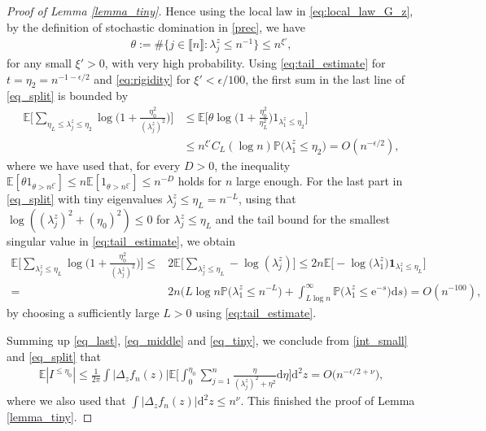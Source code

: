 \documentclass[10pt,reqno]{amsart}
\newcommand{\dd}{\mathrm{d}}
\newcommand{\<}{\langle}
\renewcommand{\>}{\rangle}
\numberwithin{equation}{section}
\begin{document}
\begin{proof}[Proof of Lemma \ref{lemma_tiny}]
	Hence using the local law in \eqref{eq:local_law_G_z}, by the definition of stochastic domination in \eqref{prec}, we have
	\begin{align}\label{eq:rigidity}
		\theta:=\#\big\{j\in \llbracket n
        \rrbracket: \lambda^z_j \leq n^{-1} \big\} \leq n^{\xi'},
	\end{align}
    for any small $\xi'>0$, with very high probability. Using \eqref{eq:tail_estimate} for $t=\eta_2=n^{-1-\epsilon/2}$ and \eqref{eq:rigidity} for $\xi'<\epsilon/100$, the first sum in the last line of \eqref{eq_split} is bounded by
	\begin{align}\label{eq_middle}
		\mathbb{E}\Big[ \sum_{\eta_L \leq  \lambda^z_j \leq \eta_2} \log \Big( 1+\frac{\eta_0^2}{(\lambda^z_j)^2}\Big)\Big] &\leq 
        \mathbb E \Big[
        \theta \log \Big( 1+\frac{\eta_0^2}{\eta_L^2}\Big)
        1_{\lambda_1^z \leq \eta_2}   
        \Big]\\
        &\leq
        n^{\xi'} C_L (\log n)\mathbb{P}\big( \lambda^z_1 \leq \eta_2 \big) =O(n^{-\epsilon/2}),
	\end{align}
where we have used
that, for every $D>0$, the inequality
$\mathbb E[\theta 1_{\theta > n^{\xi'}}]
\leq 
n\mathbb E[1_{\theta > n^{\xi'}}] 
\leq n^{-D}$ holds for $n$ large enough.
    For the last part in \eqref{eq_split} with tiny eigenvalues $\lambda^z_j \leq \eta_L=n^{-L}$, using that $\log ((\lambda^z_j)^2 + (\eta_0)^2) \leq 0$ 
    for $\lambda^z_j \leq \eta_L$ and the tail bound for the smallest singular value in \eqref{eq:tail_estimate}, we obtain
    \begin{align}\label{eq_tiny}
		\mathbb{E}\Big[ \sum_{ \lambda^z_j \leq \eta_L} \log \Big( 1+\frac{\eta_0^2}{(\lambda^z_j)^2}\Big)\Big] \leq & 2 \mathbb{E}\Big[ \sum_{ \lambda^z_j \leq \eta_L} -\log (\lambda^z_j)\Big] \leq 
        2n \mathbb{E} \Big[-\log \big(\lambda^z_1\big) \mathbf{1}_{\lambda^z_1 \leq \eta_L}  \Big]\nonumber\\
		= &  2n \bigg(
        L \log n \mathbb P \big(\lambda^z_1 
        \leq n^{-L} \big) + 
        \int_{L \log n}^{\infty} \mathbb{P}\big(\lambda^z_1 \leq \mathrm{e}^{-s} \big)\dd s \bigg) =O(n^{-100}),
	\end{align}
    by choosing a sufficiently large $L>0$ using \eqref{eq:tail_estimate}.
  
	Summing up \eqref{eq_last}, \eqref{eq_middle} and \eqref{eq_tiny}, we conclude from \eqref{int_small} and \eqref{eq_split} that
	\begin{align}
		\mathbb{E}| I^{\leq\eta_0}| \leq \frac{1}{2\pi} \int \big|\Delta_z f_n(z) \big| \mathbb{E} \Big[\int_{0}^{\eta_0} \sum_{j=1}^{n} \frac{\eta}{(\lambda_j^z)^2+\eta^2} \dd \eta \Big] \dd^2 z =O\big( n^{-\epsilon/2+\nu}\big), 
	\end{align}
	 where we also used that $\int|\Delta_z f_n(z)| \dd^2 z  \leq n^{\nu}$. This finished the proof of Lemma \ref{lemma_tiny}.
	
	
	
	
	
\end{proof}
\end{document}
